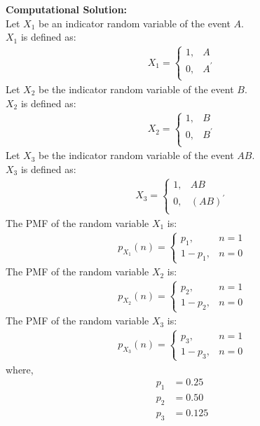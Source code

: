 \documentclass[journal]{IEEEtran}
\begin{document}
\textbf{Computational Solution:}\\
Let $X_1$ be an indicator random variable of the event $A$.\\
$X_1$ is defined as:
\begin{align}
	X_1 =
	\begin{cases}
		1 ,& A\\
		0 ,& A^\prime \\
	\end{cases}
\end{align}
Let $X_2$ be the indicator random variable of the event $B$.\\
$X_2$ is defined as:
\begin{align}
	X_2 =
	\begin{cases}
		1 ,& B\\
		0 ,& B^\prime \\
	\end{cases}
\end{align}
Let $X_3$ be the indicator random variable of the event $AB$.\\
$X_3$ is defined as:
\begin{align}
	X_3 =
	\begin{cases}
		1 ,& AB\\
		0 ,& (AB)^\prime \\
	\end{cases}
\end{align}
The PMF of the random variable $X_1$ is:
\begin{align}
	p_{X_1}(n) =
	\begin{cases}
		p_1 ,& n = 1\\
		1 - p_1 ,& n = 0
	\end{cases}
\end{align}
The PMF of the random variable $X_2$ is:
\begin{align}
	p_{X_2}(n) =
	\begin{cases}
		p_2 ,& n = 1\\
		1 - p_2 ,& n = 0
	\end{cases}
\end{align}
The PMF of the random variable $X_3$ is:
\begin{align}
	p_{X_3}(n) =
	\begin{cases}
		p_3 ,& n = 1\\
		1 - p_3 ,& n = 0
	\end{cases}
\end{align}
where,
\begin{align}
	p_1 &= 0.25\\
	p_2 &= 0.50\\
	p_3 &= 0.125
\end{align}
\end{document}

